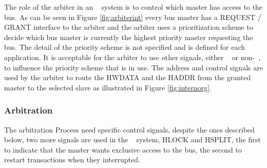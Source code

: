  The role of the arbiter in an \amba~ system is to control which master has access to the bus. As can be seen in Figure \ref{fig:arbiterint} every bus master has a REQUEST / GRANT interface to the arbiter and the arbiter uses a prioritization scheme to decide which bus master is currently the highest priority master requesting the bus. The detail of the priority scheme is not specified and is defined for each application. It is acceptable for the arbiter to use other signals, either \amba~ or non-\amba~, to influence the priority scheme that is in use.
 The address and control signals are used by  the arbiter to route the HWDATA and the HADDR from the granted master to the selected slave as illustrated in Figure     \ref{fig:internorg}.
 
 
 \subsubsection{Arbitration}
 
 The arbitration Process  need specific control signals, despite the ones described below, two more signals are used  in the \amba~ system, HLOCK and HSPLIT,  the first to indicate that the master wants exclusive access to the bus, the second to restart transactions when they  interrupted.
 
